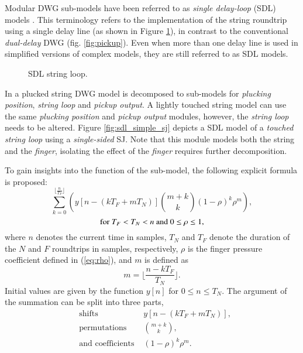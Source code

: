 \documentclass{sigchi}
\begin{document}
Modular DWG sub-models have been referred to as \textit{single delay-loop} (SDL) models \cite{karjalainen_plucked-string_1998,pakarinen_physical_2005}. This terminology refers to the implementation of the string roundtrip using a single delay line (as shown in Figure \ref{fig:sdl_string_loop}), in contrast to the conventional \textit{dual-delay} DWG (fig. \ref{fig:pickup}). Even when more than one delay line is used in simplified versions of complex models, they are still referred to as SDL models.
\begin{figure}[h]
	\centering
	\scalebox{0.75}{}
	\caption{SDL string loop.}
	\label{fig:sdl_string_loop}
\end{figure}
In \cite{karjalainen_plucked-string_1998} a plucked string DWG model is decomposed to sub-models for \textit{plucking position}, \textit{string loop} and \textit{pickup output}. A lightly touched string model can use the same \textit{plucking position} and \textit{pickup output} modules, however, the \textit{string loop} needs to be altered. Figure \ref{fig:sdl_simple_sj} depicts a SDL model of a \textit{touched string loop} using a \textit{single-sided} SJ. Note that this module models both the string and the \textit{finger}, isolating the effect of the \textit{finger} requires further decomposition.
\begin{figure*}[h]
	\centering
	\scalebox{0.8}{}
	\caption{String loop with a scattering junction.}
	\label{fig:sdl_simple_sj}
\end{figure*}
To gain insights into the function of the sub-model, the following explicit formula is proposed:
\begin{equation} \label{eq:explicit}
	\sum_{k=0}^{\lfloor \frac{n}{T_F} \rfloor}\left(y[n - (kT_F + mT_N)]\binom{m+k}{k} (1 - \rho)^{k} \rho^m\right),
\end{equation}
\begin{equation*}
	\textrm{for } T_F<T_N<n \textrm{ and } 0\leq\rho\leq1\notag,
\end{equation*}
where $n$ denotes the current time in samples, $T_N$ and $T_F$ denote the duration of the $N$ and $F$ roundtrips in samples, respectively, $\rho$ is the finger pressure coefficient defined in (\ref{eq:rho}), and $m$ is defined as
\begin{equation}
	m = \lfloor \frac{n - kT_F}{T_N} \rfloor.
\end{equation}
Initial values are given by the function $y[n]$ for $0\leq n\leq T_N$. The argument of the summation can be split into three parts,
\begin{align*}
	&\textrm{shifts } & %
	y[n - (kT_F + mT_N)], \\[1em]
	&\textrm{permutations } &%
	\binom{m+k}{k}, \\[1em]
	&\textrm{and coefficients } &%
	(1 - \rho)^{k} \rho^m.
\end{align*}
\end{document}
